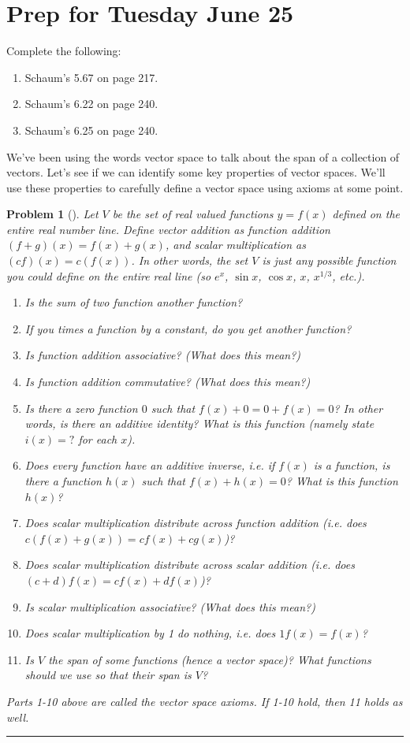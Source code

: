 \documentclass[letterpaper,oneside]{book}%
\theoremstyle{plain}
\theoremstyle{box}
\theoremstyle{problem}
\newtheorem{problemnum}{Problem}[chapter]
\newtheorem*{hwenum*}{Home Work Practice}
\newenvironment{problem}[1][]{\begin{problemnum}[#1]}{\end{problemnum}\nopagebreak\hrule\bigskip}
\newenvironment{hw*}[1][]{\begin{hwenum*}[#1]}{\end{hwenum*}\nopagebreak\hrule\bigskip}
\begin{document}
\section{Prep for Tuesday June 25}

\begin{hw*}
Complete the following:
\begin{enumerate}
 \item Schaum's 5.67 on page 217.  
 \item Schaum's 6.22 on page 240.
 \item Schaum's 6.25 on page 240. 
\end{enumerate}
\end{hw*}



We've been using the words vector space to talk about the span of a collection of vectors. Let's see if we can identify some key properties of vector spaces. We'll use these properties to carefully define a vector space using axioms at some point.
\begin{problem}
 Let $V$ be the set of real valued functions $y = f (x)$ defined on the entire real number line. Define
vector addition as function addition $(f +g)(x) = f (x)+g(x)$, and scalar multiplication as $(cf )(x) =
c(f (x))$.  In other words, the set $V$ is just any possible function you could define on the entire real line (so $e^x$,  $\sin x$, $\cos x$, $x$, $x^{1/3}$, etc.). 
\begin{enumerate}
 \item Is the sum of two function another function?
 \item If you times a function by a constant, do you get another function?
 \item Is function addition associative? (What does this mean?)
 \item Is function addition commutative? (What does this mean?)
 \item Is there a zero function $0$ such that $f(x)+0=0+f(x)=0$? In other words, is there an additive identity?  What is this function (namely state $i(x)=?$ for each $x$).
 \item Does every function have an additive inverse, i.e. if $f(x)$ is a function, is there a function $h(x)$ such that $f(x)+h(x)=0$?  What is this function  $h(x)$?
 \item Does scalar multiplication distribute across function addition (i.e. does $c(f(x)+g(x))=cf(x)+cg(x)$)?
 \item Does scalar multiplication distribute across scalar addition (i.e. does $(c+d)f(x)=cf(x)+df(x)$)?
 \item Is scalar multiplication associative? (What does this mean?)
 \item Does scalar multiplication by 1 do nothing, i.e. does $1f(x)=f(x)$?
 \item Is $V$ the span of some functions (hence a vector space)? What functions should we use so that their span is $V$?
\end{enumerate}
Parts 1-10 above are called the vector space axioms. If 1-10 hold, then 11 holds as well. 
\end{problem}
\end{document}
